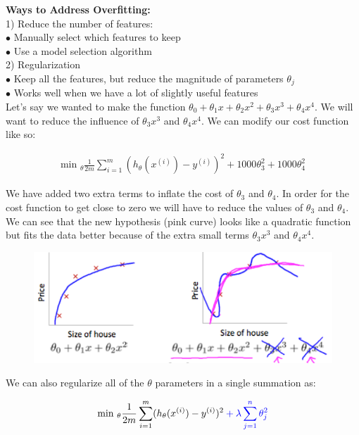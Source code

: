 \noindent \textbf{Ways to Address Overfitting:} \\
1) Reduce the number of features: \\
$\bullet$ Manually select which features to keep \\
$\bullet$ Use a model selection algorithm \\
2) Regularization \\
$\bullet$ Keep all the features, but reduce the magnitude of parameters $\theta_j$ \\
$\bullet$ Works well when we have a lot of slightly useful features \\

\noindent Let's say we wanted to make the function $\theta_0 + \theta_1 x + \theta_2 x^2 + \theta_3 x^3
+ \theta_4 x^4$. We will want to reduce the influence of $\theta_3 x^3$ and $\theta_4 x^4$. We can
modify our cost function like so:

\begin{align*}
    \text{min }_{\theta} \frac{1}{2m} \sum^m_{i=1}(h_\theta(x^{(i)})-y^{(i)})^2 + 1000\theta^2_3 +
    1000\theta^2_4
\end{align*}

\noindent We have added two extra terms to inflate the cost of $\theta_3$ and $\theta_4$. In order for
the cost function to get close to zero we will have to reduce the values of $\theta_3$ and $\theta_4$.
We can see that the new hypothesis (pink curve) looks like a quadratic function but fits the data
better because of the extra small terms $\theta_3 x^3$ and $\theta_4 x^4$.

\begin{figure}[hbt!]
    \centering
    \includegraphics[scale=0.75]{Resources/Regularization}
\end{figure}

\noindent We can also regularize all of the $\theta$ parameters in a single summation as:

\begin{align*}
    \text{min }_{\theta}\frac{1}{2m}\sum^m_{i=1}(h_\theta(x^{(i)})-y^{(i)})^2
    \color{blue} + \lambda \sum^n_{j=1}\theta^2_j \color{black}
\end{align*}

